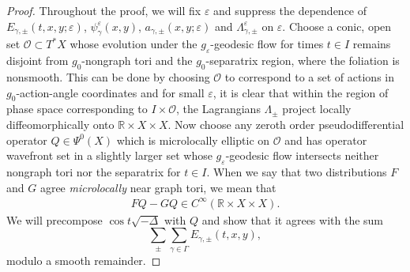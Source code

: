\documentclass[11pt,letterpaper,oneside]{amsart}
\newcommand{\R}{\mathbb{R}}
\theoremstyle{definition}
\theoremstyle{remark}
\newcommand{\eps}{\varepsilon}
\theoremstyle{definition}
\theoremstyle{remark}
\newcommand{\CO}{\mathcal{O}}
\begin{document}
\begin{proof}
    Throughout the proof, we will fix $\eps$ and suppress the dependence of $E_{\gamma,\pm}(t,x,y;\eps)$, $\psi_\gamma^\eps(x,y)$, $a_{\gamma, \pm}(x,y; \eps)$ and $\Lambda_{\gamma, \pm}^\eps$ on $\eps$. Choose a conic, open set $\mathcal{O} \subset T^*X$ whose evolution under the $g_\eps$-geodesic flow for times $t \in I$ remains disjoint from $g_0$-nongraph tori and the $g_0$-separatrix region, where the foliation is nonsmooth. This can be done by choosing $\CO$ to correspond to a set of actions in $g_0$-action-angle coordinates and for small $\eps$, it is clear that within the region of phase space corresponding to $I \times \CO$, the Lagrangians $\Lambda_\pm$ project locally diffeomorphically onto $\R \times X \times X$. Now choose any zeroth order pseudodifferential operator $Q \in \Psi^0(X)$ which is microlocally elliptic on $\CO$ and has operator wavefront set in a slightly larger set whose $g_\eps$-geodesic flow intersects neither nongraph tori nor the separatrix for $t \in I$. When we say that two distributions $F$ and $G$ agree \textit{microlocally} near graph tori, we mean that
    \begin{align*}
        F Q - G Q \in C^\infty(\R \times X \times X).
    \end{align*}
    We will precompose $\cos t \sqrt{- \Delta}$ with $Q$ and show that it agrees with the sum
    $$
    \sum_\pm \sum_{\gamma \in \Gamma} E_{\gamma, \pm}(t,x,y),
    $$
    modulo a smooth remainder.

    \medskip
    

\end{proof}
\end{document}
